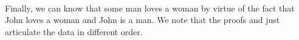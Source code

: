 \begin{code}%
\>[0]\<%
\\
\>[0]\AgdaSpace{}%
\AgdaSymbol{:}\AgdaSpace{}%
\AgdaSpace{}%
\AgdaSpace{}%
\<%
\\
\>[0]\AgdaSpace{}%
\AgdaSymbol{(}\AgdaSpace{}%
\AgdaOperator{\AgdaInductiveConstructor{,}}\AgdaSpace{}%
\AgdaSpace{}%
\AgdaOperator{\AgdaInductiveConstructor{,}}\AgdaSpace{}%
\AgdaSpace{}%
\AgdaSymbol{)}\AgdaSpace{}%
\AgdaSymbol{=}\<%
\\
\>[0][@{}l@{\AgdaIndent{0}}]%
\>[2]\AgdaSpace{}%
\AgdaOperator{\AgdaInductiveConstructor{,}}\AgdaSpace{}%
\AgdaSpace{}%
\AgdaOperator{\AgdaInductiveConstructor{,}}\AgdaSpace{}%
\AgdaSpace{}%
\AgdaSpace{}%
\<%
\end{code}

Finally, we can know that some man loves a woman by virtue of the fact that John
loves a woman and John is a man. We note that the proofs  and
 just articulate the data in different order.

